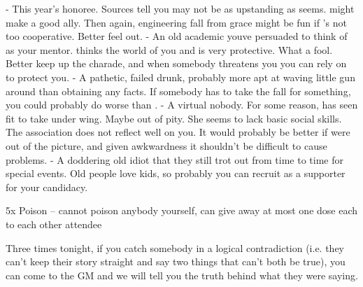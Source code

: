 \documentclass[char]{guildcamp4}
\begin{document}
\begin{contacts}
	\contact{\cMackey{}} - This year's honoree. Sources tell you \cMackey{\they} may not be as upstanding as \cMackey{\they} seems.  might make a good ally. Then again, engineering \cMackey{\their} fall from grace might be fun if 's not too cooperative. Better feel \cMackey{\them}  out.
	\contact{\cHistorian{}} - An old academic youve persuaded to think of  as your mentor.  thinks the world of you and is very protective. What a fool. Better keep up the charade, and when somebody threatens you you can rely on  to protect you.
	\contact{\cMarlowe{}} - A pathetic, failed drunk, probably more apt at waving  little gun around than obtaining any facts. If somebody has to take the fall for something, you could probably do worse than .
	\contact{\cLisbet{}} - A virtual nobody. For some reason, \cHistorian{} has seen fit to take  under  wing. Maybe out of pity. She seems to lack basic social skills. The association does not reflect well on you. It would probably be better if  were out of the picture, and given  awkwardness it shouldn't be difficult to cause  problems.
	\contact{\cTeaLady{}} - A doddering old idiot that they still trot out from time to time for special events. Old people love kids, so probably you can recruit  as a supporter for your candidacy.
\end{contacts}

\begin{itemz}[Items]
	\item 5x Poison -- cannot poison anybody yourself, can give away at most one dose each to each other attendee
\end{itemz} 

\begin{itemz}[Abilities]
	\item Three times tonight, if you catch somebody in a logical contradiction (i.e. they can't keep their story straight and say two things that can't both be true), you can come to the GM and we will tell you the truth behind what they were saying.
\end{itemz} 
\end{document}
